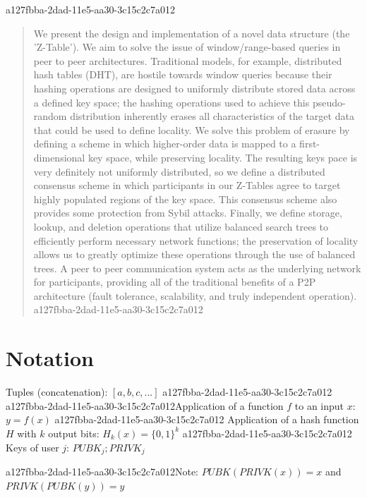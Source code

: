 \documentclass[12pt]{article}
\begin{document}
a127fbba-2dad-11e5-aa30-3c15c2c7a012\maketitle

\begin{abstract}
We present the design and implementation of a novel data structure (the 'Z-Table'). We aim to solve the issue of window/range-based queries in peer to peer architectures. Traditional models, for example,  distributed hash tables (DHT), are hostile towards window queries because their hashing operations are designed to uniformly distribute stored data across a defined key space; the hashing operations used to achieve this pseudo-random distribution inherently erases all characteristics of the target data that could be used to define locality. We solve this problem of erasure by defining a scheme in which higher-order data is mapped to a first-dimensional key space, while preserving locality. The resulting keys pace is very definitely not uniformly distributed, so we define a distributed consensus scheme in which participants in our Z-Tables agree to target highly populated regions of the key space. This consensus scheme also provides some protection from Sybil attacks. Finally, we define storage, lookup, and deletion operations that utilize balanced search trees to efficiently perform necessary network functions; the preservation of locality allows us to greatly optimize these operations through the use of balanced trees. A peer to peer communication system acts as the underlying network for participants, providing all of the traditional benefits of a P2P architecture (fault tolerance, scalability, and truly independent operation).
a127fbba-2dad-11e5-aa30-3c15c2c7a012\end{abstract}

\section{Notation}

Tuples (concatenation): $[a,b,c,...]$
a127fbba-2dad-11e5-aa30-3c15c2c7a012
a127fbba-2dad-11e5-aa30-3c15c2c7a012Application of a function $f$ to an input $x$: $y=f(x)$
a127fbba-2dad-11e5-aa30-3c15c2c7a012
Application of a hash function $H$ with $k$ output bits: $H_{k}(x) = \{0,1\}^k$
a127fbba-2dad-11e5-aa30-3c15c2c7a012
Keys of user $j$: $ PUBK_j; PRIVK_j $

a127fbba-2dad-11e5-aa30-3c15c2c7a012Note: $PUBK(PRIVK(x)) = x$ and $PRIVK(PUBK(y)) = y$~
\end{document}
